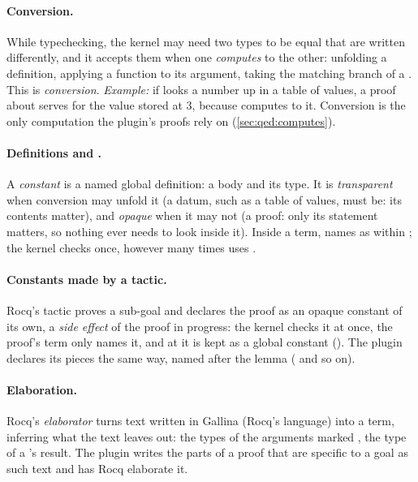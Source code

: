 \paragraph{Conversion.} While typechecking, the kernel may need two types
to be equal that are written differently, and it accepts them when one
\emph{computes} to the other: unfolding a definition, applying a function
to its argument, taking the matching branch of a . This is
\emph{conversion}. \emph{Example:} if  looks a number up in a
table of values, a proof about  serves for the value stored
at 3, because  computes to it. Conversion is the only
computation the plugin's proofs rely on (\cref{sec:qed:computes}).

\paragraph{Definitions and .} A \emph{constant} is a named
global definition: a body and its type. It is \emph{transparent} when
conversion may unfold it (a datum, such as a table of values, must be:
its contents matter), and \emph{opaque} when it may not (a proof: only its
statement matters, so nothing ever needs to look inside it). Inside a
term,  names  as  within
; the kernel checks  once, however many times 
uses .

\paragraph{Constants made by a tactic.} Rocq's tactic 
proves a sub-goal and declares the proof as an opaque constant of its own,
a \emph{side effect} of the proof in progress: the kernel checks it at
once, the proof's term only names it, and at  it is kept as a
global constant (). The plugin declares its pieces the
same way, named after the lemma ( and so on).

\paragraph{Elaboration.} Rocq's \emph{elaborator} turns text written in
Gallina (Rocq's language) into a term, inferring what the text leaves
out: the types of the arguments marked \code{_}, the type of a
's result. The plugin writes the parts of a proof that are
specific to a goal as such text and has Rocq elaborate it.

